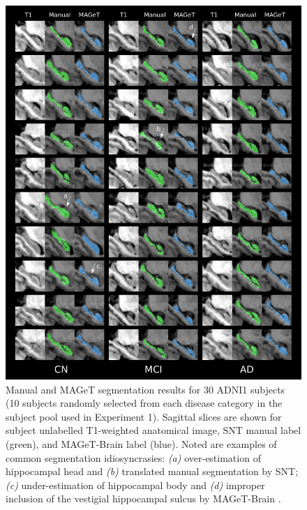 \documentclass{article}\usepackage{graphicx, color}
\newcommand{\mb}{MAGeT-Brain }
\begin{document}
\begin{figure}
  \begin{centering}
    \includegraphics[width=6in]{figure/ADNI1_SNT_MB_montage/montage.pdf}
  \end{centering}
  \caption{Manual and MAGeT segmentation results for 30 ADNI1 subjects (10
  subjects randomly selected from each disease category in the subject pool used
  in Experiment 1). Sagittal slices are shown for subject unlabelled T1-weighted
  anatomical image, SNT manual label (green), and \mb label (blue). Noted are
  examples of common segmentation idiosyncrasies: 
  {\em (a)} over-estimation of hippocampal head and  
  {\em (b)} translated manual segmentation by SNT; 
  {\em (c)} under-estimation of hippocampal body and
  {\em (d)} improper inclusion of the vestigial hippocampal sulcus by \mb.}
  \label{fig:ADNI-subfields}
\end{figure}

\end{document}
